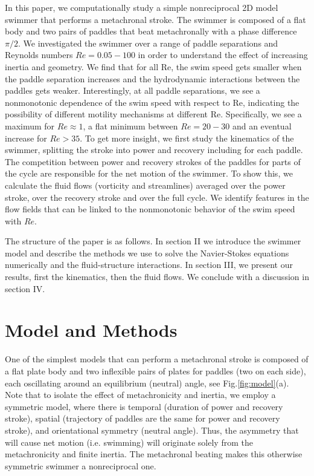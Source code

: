 \documentclass[%
 onecolumn,
superscriptaddress,
 amsmath,amssymb,
 aps,
longbibliography
]{revtex4-2}
\begin{document}
In this paper, we computationally study a simple nonreciprocal 2D model swimmer that performs a metachronal stroke. The swimmer is composed of a flat body and two pairs of paddles that beat metachronally with a phase difference $\pi/2$. We investigated the swimmer over a range of paddle separations and Reynolds numbers $Re = 0.05 - 100$ in order to understand the effect of increasing inertia and geometry. We find that for all Re, the swim speed gets smaller when the paddle separation increases and the hydrodynamic interactions between the paddles gets weaker. Interestingly, at all paddle separations, we see a nonmonotonic dependence of the swim speed with respect to Re, indicating the possibility of different motility mechanisms at different Re. Specifically, we see a maximum for $Re\approx1$, a flat minimum between $Re=20-30$ and an eventual increase for $Re>35$. To get more insight, we first study the kinematics of the swimmer, splitting the stroke into power and recovery including for each paddle. The competition between power and recovery strokes of the paddles for parts of the cycle are responsible for the net motion of the swimmer. To show this, we calculate the fluid flows (vorticity and streamlines) averaged over the power stroke, over the recovery stroke and over the full cycle. We identify features in the flow fields that can be linked to the nonmonotonic behavior of the swim speed with $Re$.  

The structure of the paper is as follows. In section II we introduce the swimmer model and describe the methods we use to solve the Navier-Stokes equations numerically and the fluid-structure interactions. In section III, we present our results, first the kinematics, then the fluid flows. We conclude with a discussion in section IV. 


\section{Model and Methods}

One of the simplest models that can perform a metachronal stroke is composed of a flat plate body and two inflexible pairs of plates for paddles (two on each side), each oscillating around an equilibrium (neutral) angle, see Fig.\ref{fig:model}(a). Note that to isolate the effect of metachronicity and inertia, we employ a symmetric model, where there is temporal (duration of power and recovery stroke), spatial (trajectory of paddles are the same for power and recovery stroke), and orientational symmetry (neutral angle). Thus, the asymmetry that will cause net motion (i.e. swimming) will originate solely from the metachronicity and finite inertia. 
The metachronal beating makes this otherwise symmetric swimmer a nonreciprocal one. 
\end{document}
